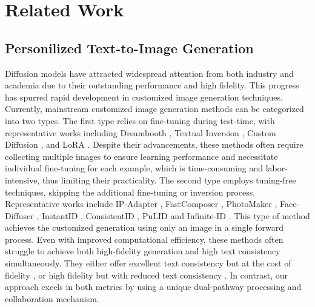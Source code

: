 \section{Related Work}
\subsection{Personilized Text-to-Image Generation} Diffusion models \cite{rombach2022high,nichol2021glide,podell2023sdxl,peebles2023scalable} have attracted widespread attention from both industry and academia due to their outstanding performance and high fidelity. This progress has spurred rapid development in customized image generation techniques. Currently, mainstream customized image generation methods can be categorized into two types. The first type relies on fine-tuning during test-time, with representative works including Dreambooth \cite{ruiz2023dreambooth}, Textual Inversion \cite{gal2022image}, Custom Diffusion \cite{kumari2023multi}, and LoRA \cite{hu2021lora}. Despite their advancements, these methods often require collecting multiple images to ensure learning performance and necessitate individual fine-tuning for each example, which is time-consuming and labor-intensive, thus limiting their practicality. The second type employs tuning-free techniques, skipping the additional fine-tuning or inversion process. Representative works include IP-Adapter \cite{ye2023ip}, FastComposer \cite{xiao2023fastcomposer}, PhotoMaker \cite{li2024photomaker}, Face-Diffuser \cite{wang2024high}, InstantID \cite{wang2024instantid}, ConsistentID  \cite{huang2024consistentid}, PuLID \cite{guo2024pulid} and Infinite-ID \cite{wu2024infinite}. This type of method achieves the customized generation using only an image in a single forward process. Even with improved computational efficiency, these methods often struggle to achieve both high-fidelity generation and high text consistency simultaneously. They either offer excellent text consistency but at the cost of fidelity \cite{li2024photomaker}, or high fidelity but with reduced text consistency \cite{huang2024consistentid,wang2024instantid,ye2023ip}. In contrast, our approach excels in both metrics by using a unique dual-pathway processing and collaboration mechanism.


